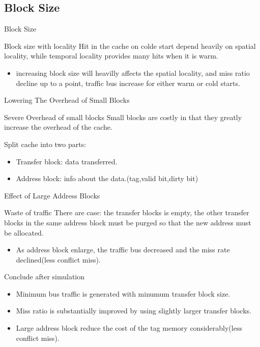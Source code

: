 \documentclass{beamer}
\begin{document}
\subsection{Block Size}
\begin{frame}{Block Size}
	\begin{block}{Block size with locality}
		Hit in the cache on colde start depend heavily on spatial locality, while temporal locality provides many hits when it is warm.
	\end{block}
	\begin{itemize}
		\item {increasing block size will heavilly affects the spatial locality, and miss ratio decline up to a point, traffic bus increase for either warm or cold starts.}
	\end{itemize}
\end{frame}

\begin{frame}{Lowering The Overhead of Small Blocks}
	\begin{block}{Severe Overhead of small blocks}
		Small blocks are costly in that they greatly increase the overhead of the cache.
	\end{block}
	\begin{block}{Split cache into two parts:}
	\end{block}
	\begin{itemize}
		\item {Transfer block: data transferred.}
		\item {Address block: info about the data.(tag,valid bit,dirty bit)}
	\end{itemize}
\end{frame}

\begin{frame}{Effect of Large Address Blocks}
	\begin{block}{Waste of traffic}
	There are case: the transfer blocks is empty, the other transfer blocks in the same address block must be purged so that the new address must be allocated.
	\end{block}
	\begin{itemize}
		\item {As address block enlarge, the traffic bus decreased and the miss rate declined(less conflict miss).}
	\end{itemize}
	\begin{block}{Conclude after simulation}
	\begin{itemize}
		\item {Minimum bus traffic is generated with minumum transfer block size.}
		\item {Miss ratio is substantially improved by using slightly larger transfer blocks.}
		\item {Large address block reduce the cost of the tag memory considerably(less conflict miss).}
	\end{itemize}
	\end{block}
\end{frame}
\end{document}
